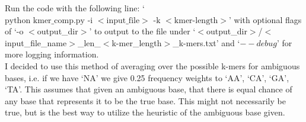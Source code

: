 \documentclass[10pt]{article}
\begin{document}
Run the code with the following line: `$\text{python kmer\_comp.py -i }<\text{input\_file}>\text{ -k }<\text{kmer-length}>$' with optional flags of `-o $<$output\_dir$>$' to output to the file under `$<$output\_dir$>$/$<$input\_file\_name$>$\_len\_$<$k-mer\_length$>$\_k-mers.txt' and `$--debug$' for more logging information.\\

I decided to use this method of averaging over the possible k-mers for ambiguous bases, i.e. if we have `NA' we give 0.25 frequency weights to `AA', `CA', `GA', `TA'. This assumes that given an ambiguous base, that there is equal chance of any base that represents it to be the true base. This might not necessarily be true, but is the best way to utilize the heuristic of the ambiguous base given.
\end{document}
